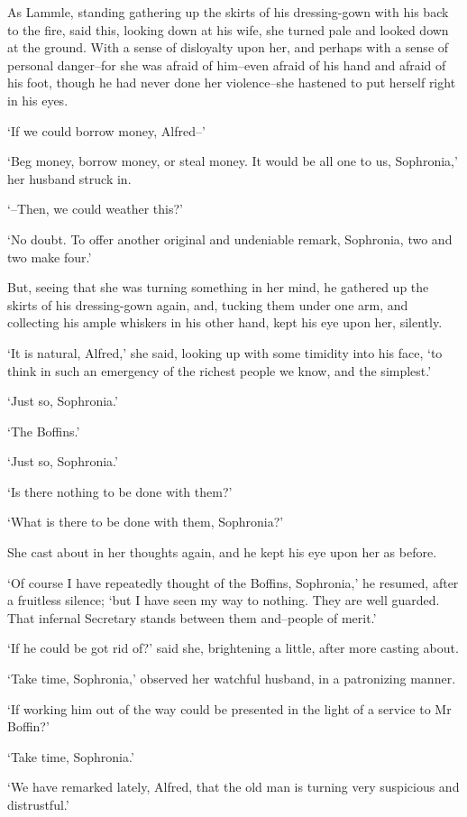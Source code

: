 As Lammle, standing gathering up the skirts of his dressing-gown with
his back to the fire, said this, looking down at his wife, she turned
pale and looked down at the ground. With a sense of disloyalty upon
her, and perhaps with a sense of personal danger--for she was afraid of
him--even afraid of his hand and afraid of his foot, though he had never
done her violence--she hastened to put herself right in his eyes.

‘If we could borrow money, Alfred--’

‘Beg money, borrow money, or steal money. It would be all one to us,
Sophronia,’ her husband struck in.

‘--Then, we could weather this?’

‘No doubt. To offer another original and undeniable remark, Sophronia,
two and two make four.’

But, seeing that she was turning something in her mind, he gathered up
the skirts of his dressing-gown again, and, tucking them under one arm,
and collecting his ample whiskers in his other hand, kept his eye upon
her, silently.

‘It is natural, Alfred,’ she said, looking up with some timidity into
his face, ‘to think in such an emergency of the richest people we know,
and the simplest.’

‘Just so, Sophronia.’

‘The Boffins.’

‘Just so, Sophronia.’

‘Is there nothing to be done with them?’

‘What is there to be done with them, Sophronia?’

She cast about in her thoughts again, and he kept his eye upon her as
before.

‘Of course I have repeatedly thought of the Boffins, Sophronia,’ he
resumed, after a fruitless silence; ‘but I have seen my way to nothing.
They are well guarded. That infernal Secretary stands between them
and--people of merit.’

‘If he could be got rid of?’ said she, brightening a little, after more
casting about.

‘Take time, Sophronia,’ observed her watchful husband, in a patronizing
manner.

‘If working him out of the way could be presented in the light of a
service to Mr Boffin?’

‘Take time, Sophronia.’

‘We have remarked lately, Alfred, that the old man is turning very
suspicious and distrustful.’

